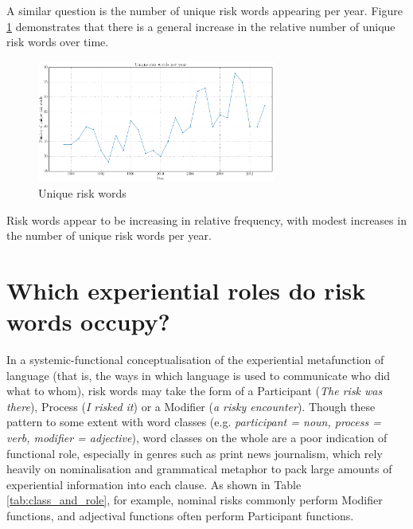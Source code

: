 A similar question is the number of unique risk words appearing per year. Figure \ref{fig:diffriskwords} demonstrates that there is a general increase in the relative number of unique risk words over time.

\begin{figure}[htb!]
\centering
\includegraphics[width=0.7\textwidth]{../images/unique_no_legend}
\caption{Unique risk words}
\label{fig:diffriskwords}
\end{figure}

\vspace{5mm}\noindent\begin{tcolorbox}[colback=yellow!5,colframe=yellow!40!black,title=Summary: frequency of risk words]
\parbox{1\textwidth}{%
Risk words appear to be increasing in relative frequency, with modest increases in the number of unique risk words per year.}
\end{tcolorbox}
\vspace{5mm}

\section{Which experiential roles do risk words occupy?} \label{sect:exprole} \FloatBarrier

In a systemic-functional conceptualisation of the experiential metafunction of language (that is, the ways in which language is used to communicate who did what to whom), risk words may take the form of a Participant (\emph{The risk was there}), Process (\emph{I risked it}) or a Modifier (\emph{a risky encounter}). Though these pattern to some extent with word classes (e.g. \emph{participant = noun, process = verb, modifier = adjective}), word classes on the whole are a poor indication of functional role, especially in genres such as print news journalism,  which rely heavily on nominalisation and grammatical metaphor to pack large amounts of experiential information into each clause. As shown in Table \ref{tab:class_and_role}, for example, nominal risks commonly perform Modifier functions, and adjectival functions often perform Participant functions.

